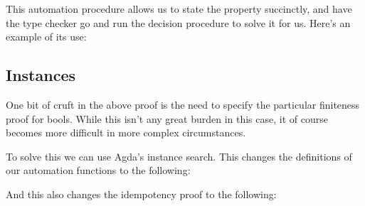 \begin{minipage}{\linewidth}
  \begin{multicols}{2}
    \begin{agdalisting}
    \end{agdalisting} \columnbreak
    \begin{agdalisting}
    \end{agdalisting}
  \end{multicols}
\end{minipage}

This automation procedure allows us to state the property succinctly, and have
the type checker go and run the decision procedure to solve it for us.
Here's an example of its use:
\begin{agdalisting}
\end{agdalisting} 

\subsection{Instances}
One bit of cruft in the above proof is the need to specify the particular
finiteness proof for bools.
While this isn't any great burden in this case, it of course becomes more
difficult in more complex circumstances.

To solve this we can use Agda's instance search.
This changes the definitions of
our automation functions to the following:

\begin{minipage}{\linewidth}
  \begin{multicols}{2}
    \begin{agdalisting}
    \end{agdalisting} \columnbreak
    \begin{agdalisting}
    \end{agdalisting}
  \end{multicols}
\end{minipage}
And this also changes the idempotency proof to the following:
\begin{agdalisting}
\end{agdalisting}

